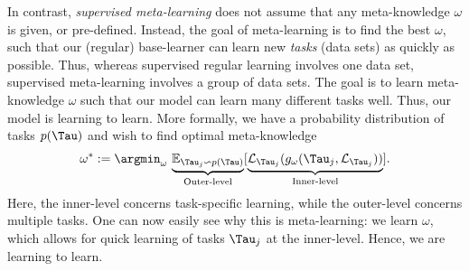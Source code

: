 In contrast, \textit{supervised meta-learning} does not  assume that any meta-knowledge $\omega$ is given, or pre-defined. Instead, the goal of meta-learning is to find the best $\omega$, such that our (regular) base-learner can learn new \textit{tasks} (data sets) as quickly as possible. Thus, whereas  supervised regular learning involves one data set, supervised meta-learning involves a group of data sets. The goal is  to learn meta-knowledge $\omega$ such that our model can learn many different tasks well. Thus, our model is learning to learn.  
More formally, we have a probability distribution of tasks $p(\Tau)$ and wish to find optimal meta-knowledge
\begin{align}
    \omega^{*} := \argmin_{\omega} \, \underbrace{\mathbb{E}_{\Tau_{j} \backsim p(\Tau)}}_\textrm{Outer-level} [ \underbrace{ \mathcal{L}_{\Tau_{j}}(g_{\omega}(\Tau_{j}, \mathcal{L}_{\Tau_{j}}))}_\textrm{Inner-level}] .
\end{align}
Here, the inner-level concerns task-specific learning, while the outer-level concerns multiple tasks.
One can now easily see why this is meta-learning: we learn $\omega$, which allows for quick learning of tasks $\Tau_{j}$ at the inner-level. Hence, we are learning to learn.

